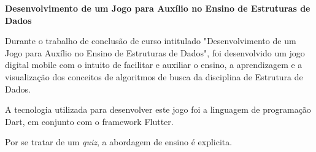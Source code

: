 \item \textbf{Desenvolvimento de um Jogo para Auxílio no Ensino de Estruturas de Dados}

Durante o trabalho de conclusão de curso intitulado "Desenvolvimento de
um Jogo para Auxílio no Ensino de Estruturas de Dados", foi desenvolvido um
jogo digital mobile com o intuito de facilitar e auxiliar o ensino, a
aprendizagem e a visualização dos conceitos de algoritmos de busca da
disciplina de Estrutura de Dados.

A tecnologia utilizada para desenvolver este jogo foi a linguagem de
programação Dart, em conjunto com o framework Flutter.

Por se tratar de um \emph{quiz}, a abordagem de ensino é explicita. \cite{glatz2023desenvolvimento}



